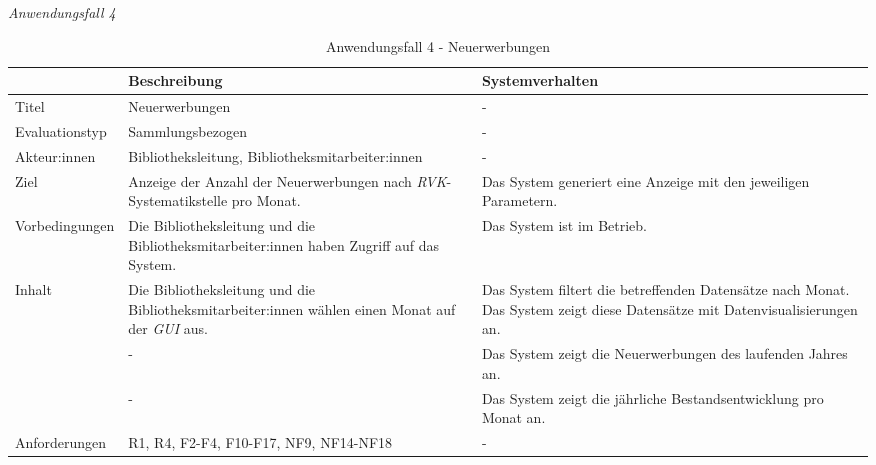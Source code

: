 \newpage
\noindent
\textit{Anwendungsfall 4}

\begingroup
\setlength{\tabcolsep}{10pt} %
\renewcommand{\arraystretch}{1.25} 
\begin{table}[h]
    \centering
    \begin{adjustbox}{max width=\textwidth}
    \begin{tabular}{lp{7.0cm}p{7.0cm}}
       \toprule
       \textbf{}          & \textbf{Beschreibung} &\textbf{Systemverhalten}\\
       \midrule
        Titel                            &Neuerwerbungen& -\\
        Evaluationstyp                   &Sammlungsbezogen                   & -\\
        Akteur:innen                     &Bibliotheksleitung, Bibliotheksmitarbeiter:innen& -\\
        Ziel                             &Anzeige der Anzahl der Neuerwerbungen nach \textit{\acrshort{RVK}}-Systematikstelle pro Monat.& Das System generiert eine Anzeige mit den jeweiligen Parametern.\\
        Vorbedingungen                   &Die Bibliotheksleitung und die Bibliotheksmitarbeiter:innen haben Zugriff auf das System.& Das System ist im Betrieb.\\
        Inhalt                           &Die Bibliotheksleitung und die Bibliotheksmitarbeiter:innen wählen einen Monat auf der \textit{\acrshort{GUI}} aus.& Das System filtert die betreffenden Datensätze nach Monat. Das System zeigt diese Datensätze mit Datenvisualisierungen an.\\
                                         &-&Das System zeigt die Neuerwerbungen des laufenden Jahres an.\\
                                         &-&Das System zeigt die jährliche Bestandsentwicklung pro Monat an.\\

        Anforderungen                   &R1, R4, F2-F4, F10-F17, NF9, NF14-NF18& -\\
        \bottomrule
    \end{tabular}
    \end{adjustbox}
    \caption{%
    Anwendungsfall 4 - Neuerwerbungen    }
    \label{tab:AF_Neuerwerbungen}
    \end{table}
\endgroup


